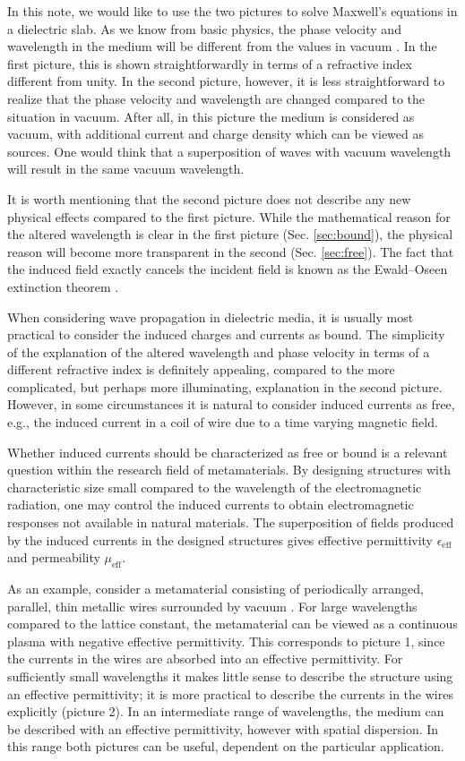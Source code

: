 \documentclass[prb,twocolumn]{revtex4-1}
\begin{document}
In this note, we would like to use the two pictures to solve Maxwell's equations in a dielectric slab. As we know from basic physics, the phase velocity and wavelength in the medium will be different from the values in vacuum \cite{landau_lifshitz_edcm,jackson,griffiths}. In the first picture, this is shown straightforwardly in terms of a refractive index different from unity. In the second picture, however, it is less straightforward to realize that the phase velocity and wavelength are changed compared to the situation in vacuum. After all, in this picture the medium is considered as vacuum, with additional current and charge density which can be viewed as sources. One would think that a superposition of waves with vacuum wavelength will result in the same vacuum wavelength.

It is worth mentioning that the second picture does not describe any new physical effects compared to the first picture. While the mathematical reason for the altered wavelength is clear in the first picture (Sec. \ref{sec:bound}), the physical reason will become more transparent in the second (Sec. \ref{sec:free}). The fact that the induced field exactly cancels the incident field is known as the Ewald--Oseen extinction theorem \cite{bornwolf,fearn96,ballenegger99}.

When considering wave propagation in dielectric media, it is usually most practical to consider the induced charges and currents as bound. The simplicity of the explanation of the altered wavelength and phase velocity in terms of a different refractive index is definitely appealing, compared to the more complicated, but perhaps more illuminating, explanation in the second picture. However, in some circumstances it is natural to consider induced currents as free, e.g., the induced current in a coil of wire due to a time varying magnetic field. 

Whether induced currents should be characterized as free or bound is a relevant question within the research field of metamaterials. By designing structures with characteristic size small compared to the wavelength of the electromagnetic radiation, one may control the induced currents to obtain electromagnetic responses not available in natural materials. The superposition of fields produced by the induced currents in the designed structures gives effective permittivity $\epsilon_\text{eff}$ and permeability $\mu_\text{eff}$. 

As an example, consider a metamaterial consisting of periodically arranged, parallel, thin metallic wires surrounded by vacuum \cite{pendry98}. For large wavelengths compared to the lattice constant, the metamaterial can be viewed as a continuous plasma with negative effective permittivity. This corresponds to picture 1, since the currents in the wires are absorbed into an effective permittivity. For sufficiently small wavelengths it makes little sense to describe the structure using an effective permittivity; it is more practical to describe the currents in the wires explicitly (picture 2). In an intermediate range of wavelengths, the medium can be described with an effective permittivity, however with spatial dispersion. In this range both pictures can be useful, dependent on the particular application.
\end{document}
